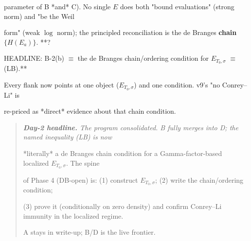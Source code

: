 \documentclass[10pt]{article}
\begin{document}
  parameter of B *and* C). No single $E$ does both "bound evaluations" (strong norm) and "be the Weil\par
  form" (weak $\log$ norm); the principled reconciliation is the de Branges \textbf{chain} $\{H(E_a)\}$. **?\par
  HEADLINE: B-2(b) $\equiv$ the de Branges chain/ordering condition for $E_{T_0,\sigma}$ $\equiv$ (LB).**\par
  Every flank now points at one object ($E_{T_0,\sigma}$) and one condition. v9's "no Conrey--Li" is\par
  re-priced as *direct* evidence about that chain condition.\par

\begin{quote}\itshape
\textbf{Day-2 headline.} The program consolidated. B fully merges into D; the named inequality (LB) is now\par
*literally* a de Branges chain condition for a Gamma-factor-based localized $E_{T_0,\sigma}$. The spine\par
of Phase 4 (DB-open) is: (1) construct $E_{T_0,\sigma}$; (2) write the chain/ordering condition;\par
(3) prove it (conditionally on zero density) and confirm Conrey--Li immunity in the localized regime.\par
A stays in write-up; B/D is the live frontier.\par
\end{quote}
\end{document}
